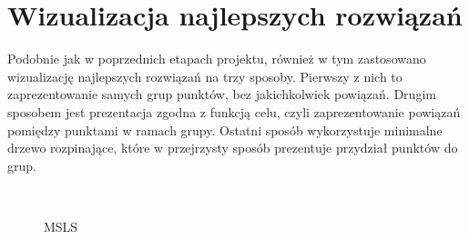 \documentclass[main.tex]{subfiles}
\begin{document}
\section{Wizualizacja najlepszych rozwiązań}
Podobnie jak w poprzednich etapach projektu, również w tym zastosowano wizualizację najlepszych rozwiązań na trzy sposoby. Pierwszy z nich to zaprezentowanie samych grup punktów, bez jakichkolwiek powiązań. Drugim sposobem jest prezentacja zgodna z funkcją celu, czyli zaprezentowanie powiązań pomiędzy punktami w ramach grupy. Ostatni sposób wykorzystuje minimalne drzewo rozpinające, które w przejrzysty sposób prezentuje przydział punktów do grup.

\begin{figure}[H]
     \begin{center}
        \\
    \end{center}
    \caption{MSLS}
\end{figure}
\end{document}
